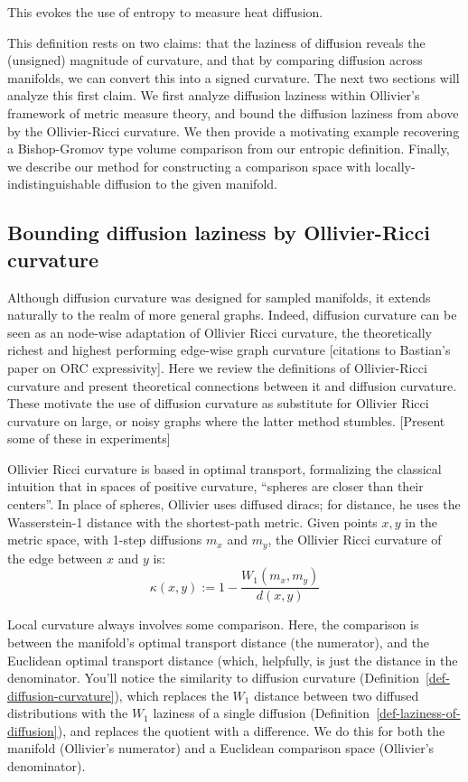 \documentclass[
  letterpaper,
  DIV=11,
  numbers=noendperiod]{scrartcl}
\theoremstyle{plain}
\theoremstyle{plain}
\theoremstyle{definition}
\theoremstyle{plain}
\theoremstyle{definition}
\theoremstyle{remark}
\begin{document}
This evokes the use of entropy to measure heat diffusion.

This definition rests on two claims: that the laziness of diffusion
reveals the (unsigned) magnitude of curvature, and that by comparing
diffusion across manifolds, we can convert this into a signed curvature.
The next two sections will analyze this first claim. We first analyze
diffusion laziness within Ollivier's framework of metric measure theory,
and bound the diffusion laziness from above by the Ollivier-Ricci
curvature. We then provide a motivating example recovering a
Bishop-Gromov type volume comparison from our entropic definition.
Finally, we describe our method for constructing a comparison space with
locally-indistinguishable diffusion to the given manifold.

\subsection{Bounding diffusion laziness by Ollivier-Ricci
curvature}\label{bounding-diffusion-laziness-by-ollivier-ricci-curvature}

Although diffusion curvature was designed for sampled manifolds, it
extends naturally to the realm of more general graphs. Indeed, diffusion
curvature can be seen as an node-wise adaptation of Ollivier Ricci
curvature, the theoretically richest and highest performing edge-wise
graph curvature {[}citations to Bastian's paper on ORC expressivity{]}.
Here we review the definitions of Ollivier-Ricci curvature and present
theoretical connections between it and diffusion curvature. These
motivate the use of diffusion curvature as substitute for Ollivier Ricci
curvature on large, or noisy graphs where the latter method stumbles.
{[}Present some of these in experiments{]}

Ollivier Ricci curvature is based in optimal transport, formalizing the
classical intuition that in spaces of positive curvature, ``spheres are
closer than their centers''. In place of spheres, Ollivier uses diffused
diracs; for distance, he uses the Wasserstein-1 distance with the
shortest-path metric. Given points \(x,y\) in the metric space, with
1-step diffusions \(m_{x}\) and \(m_{y}\), the Ollivier Ricci curvature
of the edge between \(x\) and \(y\) is:
\[\kappa(x, y):=1-\frac{W_1\left(m_x, m_y\right)}{d(x, y)}\]

Local curvature always involves some comparison. Here, the comparison is
between the manifold's optimal transport distance (the numerator), and
the Euclidean optimal transport distance (which, helpfully, is just the
distance in the denominator. You'll notice the similarity to diffusion
curvature (Definition~\ref{def-diffusion-curvature}), which replaces the
\(W_{1}\) distance between two diffused distributions with the \(W_{1}\)
laziness of a single diffusion
(Definition~\ref{def-laziness-of-diffusion}), and replaces the quotient
with a difference. We do this for both the manifold (Ollivier's
numerator) and a Euclidean comparison space (Ollivier's denominator).
\end{document}
